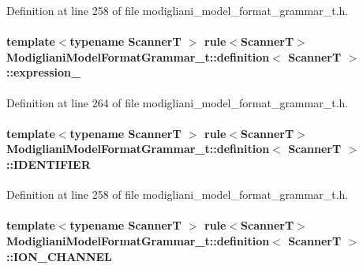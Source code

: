 Definition at line 258 of file modigliani\_\-model\_\-format\_\-grammar\_\-t.h.

\paragraph[{expression\_\-}]{\setlength{\rightskip}{0pt plus 5cm}template$<$typename ScannerT $>$ rule$<$ScannerT$>$ {\bf ModiglianiModelFormatGrammar\_\-t::definition}$<$ ScannerT $>$::{\bf expression\_\-}}\hfill\label{struct_modigliani_model_format_grammar__t_1_1definition_ad11bbe006d8b2de2c040b4d3541c18ed}


Definition at line 264 of file modigliani\_\-model\_\-format\_\-grammar\_\-t.h.

\paragraph[{IDENTIFIER}]{\setlength{\rightskip}{0pt plus 5cm}template$<$typename ScannerT $>$ rule$<$ScannerT$>$ {\bf ModiglianiModelFormatGrammar\_\-t::definition}$<$ ScannerT $>$::{\bf IDENTIFIER}}\hfill\label{struct_modigliani_model_format_grammar__t_1_1definition_a94ef78f7ae8dc3cc52359b1c774e721b}


Definition at line 258 of file modigliani\_\-model\_\-format\_\-grammar\_\-t.h.

\paragraph[{ION\_\-CHANNEL}]{\setlength{\rightskip}{0pt plus 5cm}template$<$typename ScannerT $>$ rule$<$ScannerT$>$ {\bf ModiglianiModelFormatGrammar\_\-t::definition}$<$ ScannerT $>$::{\bf ION\_\-CHANNEL}}\hfill\label{struct_modigliani_model_format_grammar__t_1_1definition_af5d6dee13b542d524663213ad0044fe8}


